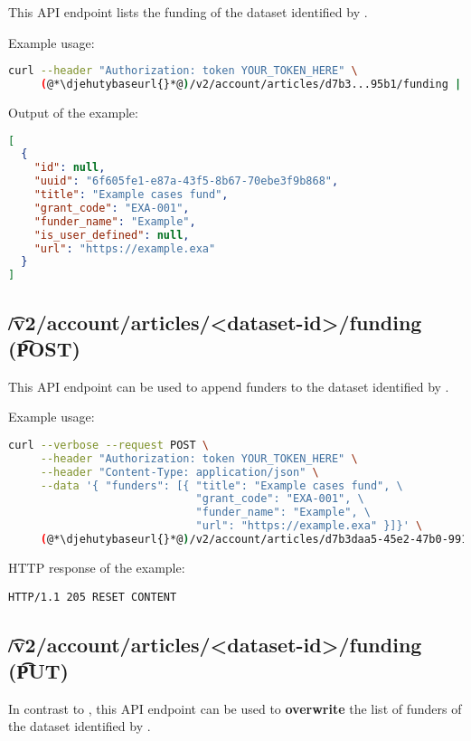   This API endpoint lists the funding of the dataset identified by .

  Example usage:
\begin{lstlisting}[language=bash]
curl --header "Authorization: token YOUR_TOKEN_HERE" \
     (@*\djehutybaseurl{}*@)/v2/account/articles/d7b3...95b1/funding | jq
\end{lstlisting}

  Output of the example:
\begin{lstlisting}[language=JSON]
[
  {
    "id": null,
    "uuid": "6f605fe1-e87a-43f5-8b67-70ebe3f9b868",
    "title": "Example cases fund",
    "grant_code": "EXA-001",
    "funder_name": "Example",
    "is_user_defined": null,
    "url": "https://example.exa"
  }
]
\end{lstlisting}

\subsection{\t{/v2/account/articles/<dataset-id>/funding} (\t{POST})}
\label{sec:api-v2-articles-funding-post}

  This API endpoint can be used to append funders to the dataset identified
  by \code{dataset-id}.

  \fundingParameters

  Example usage:
\begin{lstlisting}[language=bash]
curl --verbose --request POST \
     --header "Authorization: token YOUR_TOKEN_HERE" \
     --header "Content-Type: application/json" \
     --data '{ "funders": [{ "title": "Example cases fund", \
                             "grant_code": "EXA-001", \
                             "funder_name": "Example", \
                             "url": "https://example.exa" }]}' \
     (@*\djehutybaseurl{}*@)/v2/account/articles/d7b3daa5-45e2-47b0-9910-0f7fa6a995b1/funding
\end{lstlisting}

  HTTP response of the example:
\begin{lstlisting}
HTTP/1.1 205 RESET CONTENT
\end{lstlisting}

\subsection{\t{/v2/account/articles/<dataset-id>/funding} (\t{PUT})}

  In contrast to , this API endpoint
  can be used to \textbf{overwrite} the list of funders of the dataset
  identified by .

